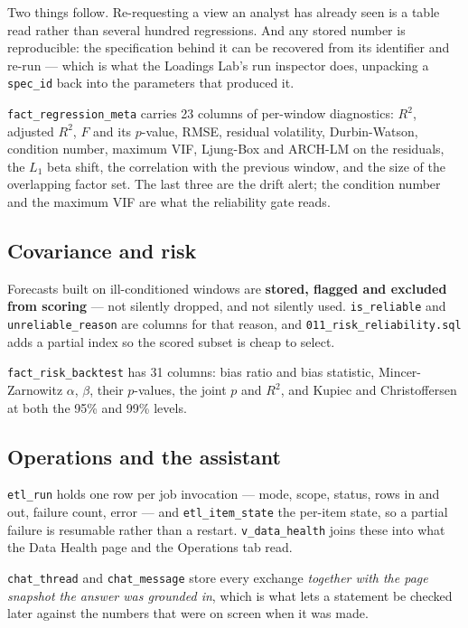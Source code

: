 \documentclass[11pt,a4paper]{article}
\newcommand{\code}[1]{\texttt{\small #1}}
\begin{document}
Two things follow. Re-requesting a view an analyst has already seen is a table read
rather than several hundred regressions. And any stored number is reproducible: the
specification behind it can be recovered from its identifier and re-run --- which
is what the Loadings Lab's run inspector does, unpacking a \code{spec\_id} back
into the parameters that produced it.

\code{fact\_regression\_meta} carries 23 columns of per-window diagnostics: $R^2$,
adjusted $R^2$, $F$ and its $p$-value, RMSE, residual volatility, Durbin-Watson,
condition number, maximum VIF, Ljung-Box and ARCH-LM on the residuals, the $L_1$
beta shift, the correlation with the previous window, and the size of the
overlapping factor set. The last three are the drift alert; the condition number
and the maximum VIF are what the reliability gate reads.

\subsection{Covariance and risk}

Forecasts built on ill-conditioned windows are \textbf{stored, flagged and excluded
from scoring} --- not silently dropped, and not silently used.
\code{is\_reliable} and \code{unreliable\_reason} are columns for that reason, and
\code{011\_risk\_reliability.sql} adds a partial index so the scored subset is cheap
to select.

\code{fact\_risk\_backtest} has 31 columns: bias ratio and bias statistic,
Mincer-Zarnowitz $\alpha$, $\beta$, their $p$-values, the joint $p$ and $R^2$, and
Kupiec and Christoffersen at both the 95\% and 99\% levels.

\subsection{Operations and the assistant}

\code{etl\_run} holds one row per job invocation --- mode, scope, status, rows in
and out, failure count, error --- and \code{etl\_item\_state} the per-item state, so
a partial failure is resumable rather than a restart. \code{v\_data\_health} joins
these into what the Data Health page and the Operations tab read.

\code{chat\_thread} and \code{chat\_message} store every exchange \emph{together
with the page snapshot the answer was grounded in}, which is what lets a statement
be checked later against the numbers that were on screen when it was made.
\end{document}
